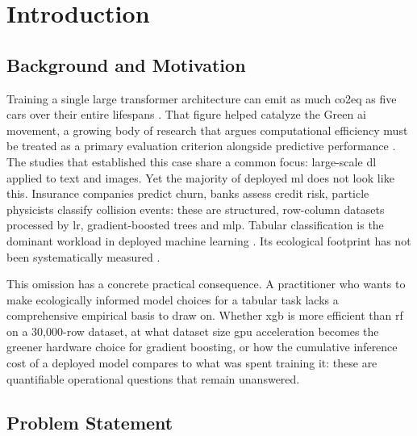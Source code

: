 \chapter{Introduction}
\label{introduction}


\section{Background and Motivation}
\label{sec:intro_motivation}

Training a single large transformer architecture can emit as much \gls{co2eq} as five cars over their entire lifespans \parencite{strubellEnergyPolicyConsiderations2019a}. That figure helped catalyze the Green \gls{ai} movement, a growing body of research that argues computational efficiency must be treated as a primary evaluation criterion alongside predictive performance \parencite{schwartzGreenAI2020}. The studies that established this case share a common focus: large-scale \gls{dl} applied to text and images. Yet the majority of deployed \gls{ml} does not look like this. Insurance companies predict churn, banks assess credit risk, particle physicists classify collision events: these are structured, row-column datasets processed by \gls{lr}, gradient-boosted trees and \gls{mlp}. Tabular classification is the dominant workload in deployed machine learning \parencite{grinsztajnWhyTreebasedModels2022a,gorishniyRevisitingDeepLearning2021a}. Its ecological footprint has not been systematically measured \parencite{strubellEnergyPolicyConsiderations2019a}.

This omission has a concrete practical consequence. A practitioner who wants to make ecologically informed model choices for a tabular task lacks a comprehensive empirical basis to draw on. Whether \gls{xgb} is more efficient than \gls{rf} on a 30{,}000-row dataset, at what dataset size \gls{gpu} acceleration becomes the greener hardware choice for gradient boosting, or how the cumulative inference cost of a deployed model compares to what was spent training it: these are quantifiable operational questions that remain unanswered.


\section{Problem Statement}
\label{sec:intro_problem}

